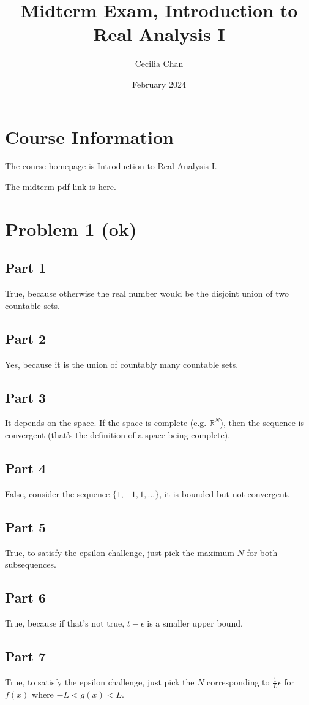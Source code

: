 \documentclass{article}
\title{Midterm Exam, Introduction to Real Analysis I}
\author{Cecilia Chan}
\date{February 2024}
\begin{document}
\maketitle
\section*{Course Information}
The course homepage is \href{https://math.rutgers.edu/academics/undergraduate/courses/955-01-640-311-introduction-to-real-analysis-i}{Introduction to Real Analysis I}.

The midterm pdf link is \href{https://math.rutgers.edu/images/test-311-10-2016.pdf}{here}.
\section*{Problem 1 (ok)}
\subsection*{Part 1}
True, because otherwise the real number would be the disjoint union of two countable sets.
\subsection*{Part 2}
Yes, because it is the union of countably many countable sets.
\subsection*{Part 3}
It depends on the space. If the space is complete (e.g. $ \mathbb{R}^N $), then the sequence is convergent (that's the definition of a space being complete).
\subsection*{Part 4}
False, consider the sequence $ \{1, -1, 1, \ldots \} $, it is bounded but not convergent.
\subsection*{Part 5}
True, to satisfy the epsilon challenge, just pick the maximum $ N $ for both subsequences.
\subsection*{Part 6}
True, because if that's not true, $ t - \epsilon $ is a smaller upper bound.
\subsection*{Part 7}
True, to satisfy the epsilon challenge, just pick the $ N $ corresponding to $ \frac{1}{L} \epsilon $ for $ f(x) $ where $ -L < g(x) < L$.
\end{document}
